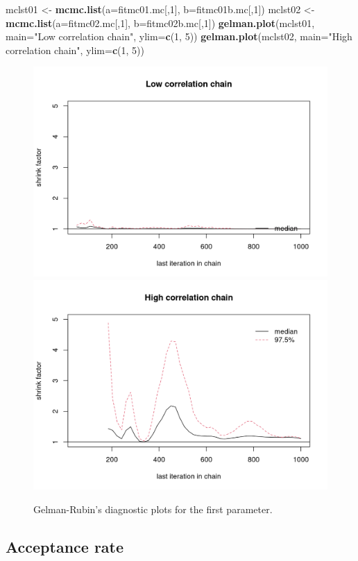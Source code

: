 \documentclass[
]{book}
\newenvironment{Shaded}{\begin{snugshade}}{\end{snugshade}}
\newcommand{\AttributeTok}[1]{\textcolor[rgb]{0.13,0.29,0.53}{#1}}
\newcommand{\DecValTok}[1]{\textcolor[rgb]{0.00,0.00,0.81}{#1}}
\newcommand{\FunctionTok}[1]{\textcolor[rgb]{0.13,0.29,0.53}{\textbf{#1}}}
\newcommand{\NormalTok}[1]{#1}
\newcommand{\OtherTok}[1]{\textcolor[rgb]{0.56,0.35,0.01}{#1}}
\newcommand{\StringTok}[1]{\textcolor[rgb]{0.31,0.60,0.02}{#1}}
\begin{document}
\begin{Shaded}
\begin{Highlighting}[]
\NormalTok{mclst01 }\OtherTok{\textless{}{-}} \FunctionTok{mcmc.list}\NormalTok{(}\AttributeTok{a=}\NormalTok{fitmc01.mc[,}\DecValTok{1}\NormalTok{], }\AttributeTok{b=}\NormalTok{fitmc01b.mc[,}\DecValTok{1}\NormalTok{])}
\NormalTok{mclst02 }\OtherTok{\textless{}{-}} \FunctionTok{mcmc.list}\NormalTok{(}\AttributeTok{a=}\NormalTok{fitmc02.mc[,}\DecValTok{1}\NormalTok{], }\AttributeTok{b=}\NormalTok{fitmc02b.mc[,}\DecValTok{1}\NormalTok{])}
\FunctionTok{gelman.plot}\NormalTok{(mclst01, }\AttributeTok{main=}\StringTok{"Low correlation chain"}\NormalTok{, }\AttributeTok{ylim=}\FunctionTok{c}\NormalTok{(}\DecValTok{1}\NormalTok{, }\DecValTok{5}\NormalTok{))}
\FunctionTok{gelman.plot}\NormalTok{(mclst02, }\AttributeTok{main=}\StringTok{"High correlation chain"}\NormalTok{, }\AttributeTok{ylim=}\FunctionTok{c}\NormalTok{(}\DecValTok{1}\NormalTok{, }\DecValTok{5}\NormalTok{))}
\end{Highlighting}
\end{Shaded}

\begin{figure}
\includegraphics[width=0.5\linewidth]{_bookdown_files/_main_files/figure-html/gelm01-1} \includegraphics[width=0.5\linewidth]{_bookdown_files/_main_files/figure-html/gelm01-2} \caption{Gelman-Rubin's diagnostic plots for the first parameter.}\label{fig:gelm01}
\end{figure}

\hypertarget{acceptance-rate}{%
\subsection{Acceptance rate}\label{acceptance-rate}}
\end{document}
